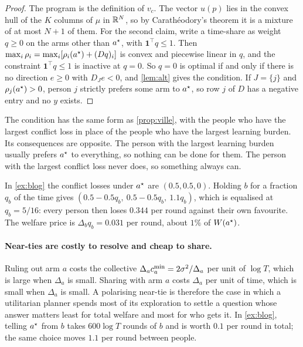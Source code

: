 \begin{proof}
The program is the definition of $v_c$. The vector $u(p)$ lies in the convex hull of the $K$ columns of $\mu$ in $\mathbb{R}^N$, so by Carath\'eodory's theorem it is a mixture of at most $N+1$ of them. For the second claim, write a time-share as weight $q\ge0$ on the arms other than $a^\star$, with $\mathbf 1^\top q\le1$. Then $\max_i\rho_i=\max_i[\rho_i(a^\star)+(Dq)_i]$ is convex and piecewise linear in $q$, and the constraint $\mathbf 1^\top q\le1$ is inactive at $q=0$. So $q=0$ is optimal if and only if there is no direction $e\ge0$ with $D_Je<0$, and \cref{lem:alt} gives the condition. If $J=\{j\}$ and $\rho_j(a^\star)>0$, person $j$ strictly prefers some arm to $a^\star$, so row $j$ of $D$ has a negative entry and no $y$ exists.
\end{proof}

The condition has the same form as \cref{prop:ville}, with the people who have the largest conflict loss in place of the people who have the largest learning burden. Its consequences are opposite. The person with the largest learning burden usually prefers $a^\star$ to everything, so nothing can be done for them. The person with the largest conflict loss never does, so something always can.

\begin{example}\label{ex:share}
In \cref{ex:blog} the conflict losses under $a^\star$ are $(0.5,0.5,0)$. Holding $b$ for a fraction $q_b$ of the time gives $(0.5-0.5q_b,\ 0.5-0.5q_b,\ 1.1q_b)$, which is equalised at $q_b=5/16$: every person then loses $0.344$ per round against their own favourite. The welfare price is $\Delta_bq_b=0.031$ per round, about $1\%$ of $W(a^\star)$.
\end{example}

\paragraph{Near-ties are costly to resolve and cheap to share.} Ruling out arm $a$ costs the collective $\Delta_ac^{\min}_a=2\sigma^2/\Delta_a$ per unit of $\log T$, which is large when $\Delta_a$ is small. Sharing with arm $a$ costs $\Delta_a$ per unit of time, which is small when $\Delta_a$ is small. A polarising near-tie is therefore the case in which a utilitarian planner spends most of its exploration to settle a question whose answer matters least for total welfare and most for who gets it. In \cref{ex:blog}, telling $a^\star$ from $b$ takes $600\log T$ rounds of $b$ and is worth $0.1$ per round in total; the same choice moves $1.1$ per round between people.

